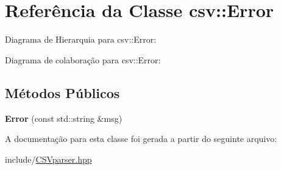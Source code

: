 \hypertarget{classcsv_1_1Error}{}\section{Referência da Classe csv\+:\+:Error}
\label{classcsv_1_1Error}


Diagrama de Hierarquia para csv\+:\+:Error\+:


Diagrama de colaboração para csv\+:\+:Error\+:
\subsection*{Métodos Públicos}
\begin{DoxyCompactItemize}
\item 
\mbox{\label{classcsv_1_1Error_afebdc6f80497e8701658c76d6c719463}} 
{\bfseries Error} (const std\+::string \&msg)
\end{DoxyCompactItemize}


A documentação para esta classe foi gerada a partir do seguinte arquivo\+:\begin{DoxyCompactItemize}
\item 
include/\hyperlink{CSVparser_8hpp}{C\+S\+Vparser.\+hpp}\end{DoxyCompactItemize}
